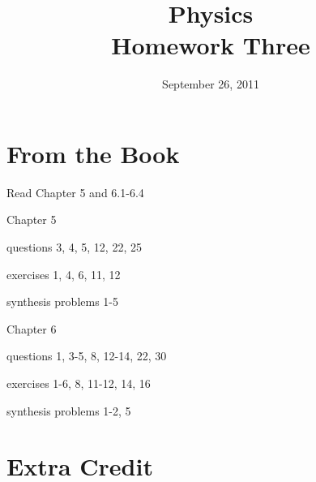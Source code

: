 \documentclass{exam}
\title{Physics \\ Homework Three}
\date{September 26, 2011}
\begin{document}
\maketitle

\section{From the Book}

\begin{itemize*}
  \item Read Chapter 5 and 6.1-6.4
  \item Chapter 5
    \begin{itemize*}
      \item questions 3, 4, 5, 12, 22, 25
      \item exercises 1, 4, 6, 11, 12
      \item synthesis problems 1-5
    \end{itemize*}
  \item Chapter 6
    \begin{itemize*}
      \item questions 1, 3-5, 8, 12-14, 22, 30
      \item exercises 1-6, 8, 11-12, 14, 16
      \item synthesis problems 1-2, 5
    \end{itemize*}
\end{itemize*}

\section{Extra Credit}
\end{document}
